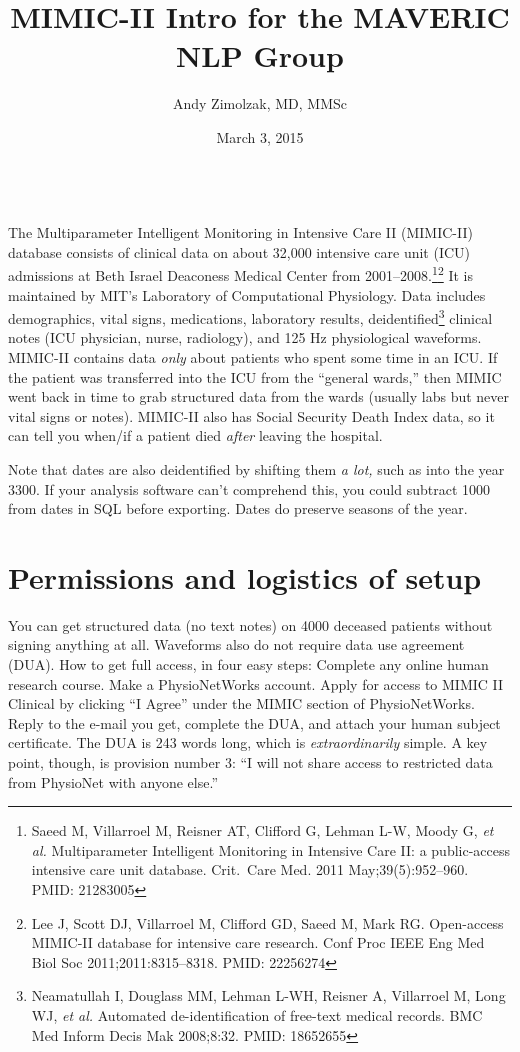 \documentclass{tufte-handout}
\title{MIMIC-II Intro for the MAVERIC NLP Group}
\author{Andy Zimolzak, MD, MMSc}
\date{March 3, 2015}
\begin{document}
\maketitle

~\\

The Multiparameter Intelligent Monitoring in Intensive Care II
(MIMIC-II) database consists of clinical data on about 32,000
intensive care unit (ICU) admissions at Beth Israel Deaconess Medical
Center from 2001--2008.\footnote{Saeed M, Villarroel M, Reisner AT,
  Clifford G, Lehman L-W, Moody G, \emph{et al.} Multiparameter
  Intelligent Monitoring in Intensive Care II: a public-access
  intensive care unit database. Crit.\ Care Med. 2011
  May;39(5):952–960. PMID: 21283005}\footnote{Lee J, Scott DJ,
  Villarroel M, Clifford GD, Saeed M, Mark RG. Open-access MIMIC-II
  database for intensive care research. Conf Proc IEEE Eng Med Biol
  Soc 2011;2011:8315–8318. PMID: 22256274} It is maintained by MIT's
Laboratory of Computational Physiology. Data includes demographics,
vital signs, medications, laboratory results,
deidentified\footnote{Neamatullah I, Douglass MM, Lehman L-WH, Reisner
  A, Villarroel M, Long WJ, \emph{et al.} Automated de-identification
  of free-text medical records. BMC Med Inform Decis Mak 2008;8:32.
  PMID: 18652655 } clinical notes (ICU physician, nurse, radiology),
and 125 Hz physiological waveforms. MIMIC-II contains data \emph{only}
about patients who spent some time in an ICU. If the patient was
transferred into the ICU from the ``general wards,'' then MIMIC went
back in time to grab structured data from the wards (usually labs but
never vital signs or notes). MIMIC-II also has Social Security Death
Index data, so it can tell you when/if a patient died \emph{after}
leaving the hospital.

Note that dates are also deidentified by shifting them \emph{a lot,}
such as into the year 3300. If your analysis software can't comprehend
this, you could subtract 1000 from dates in SQL before exporting.
Dates do preserve seasons of the year. 


\section{Permissions and logistics of setup}

You can get structured data (no text notes) on 4000 deceased patients
without signing anything at all. Waveforms also do not require data
use agreement (DUA). How to get full access, in four easy steps:
Complete any online human research course. Make a PhysioNetWorks
account. Apply for access to MIMIC II Clinical by clicking ``I Agree''
under the MIMIC section of PhysioNetWorks. Reply to the e-mail you
get, complete the DUA, and attach your human subject certificate. The
DUA is 243 words long, which is \emph{extraordinarily} simple. A key
point, though, is provision number 3: ``I will not share access to
restricted data from PhysioNet with anyone else.''
\end{document}
